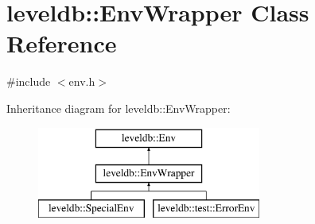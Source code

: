 \hypertarget{classleveldb_1_1_env_wrapper}{}\section{leveldb\+:\+:Env\+Wrapper Class Reference}
\label{classleveldb_1_1_env_wrapper}


{\ttfamily \#include $<$env.\+h$>$}

Inheritance diagram for leveldb\+:\+:Env\+Wrapper\+:\begin{figure}[H]
\begin{center}
\leavevmode
\includegraphics[height=3.000000cm]{classleveldb_1_1_env_wrapper}
\end{center}
\end{figure}
